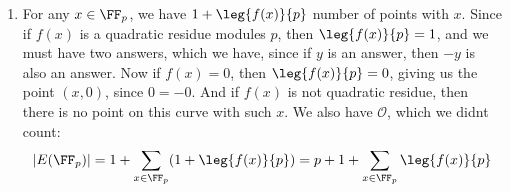 \begin{enumerate}[label=]
    \item 
        For any $x \in \FF_p$, we have $1 + \leg{f(x)}{p}$ number of points with $x$. Since if $f(x)$ is a quadratic residue modules $p$, then $\leg{f(x)}{p} = 1$, and we must have two answers, which we have, since if $y$ is an answer, then $-y$ is also an answer. Now if $f(x) = 0$, then $\leg{f(x)}{p} = 0$, giving us the point $(x, 0)$, since $0 = -0$. And if $f(x)$ is not quadratic residue, then there is no point on this curve with such $x$. We also have $\mathcal O$, which we didnt count:
        \begin{gather*}
            |E(\FF_p) | = 1 + \sum_{x \in \FF_p}(1 + \leg{f(x)}{p}) = p + 1 + \sum_{x \in \FF_p} \leg{f(x)}{p}
        \end{gather*}
\end{enumerate}